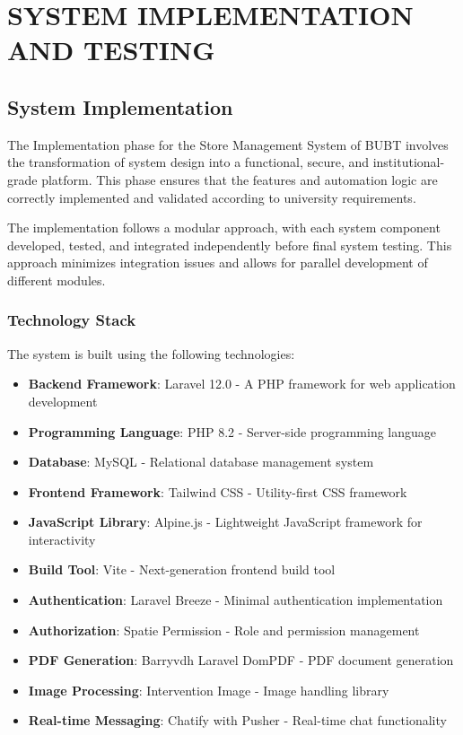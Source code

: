 \chapter{SYSTEM IMPLEMENTATION AND TESTING}
\label{chap:implementation}

\section{System Implementation}

The Implementation phase for the Store Management System of BUBT involves the transformation of system design into a functional, secure, and institutional-grade platform. This phase ensures that the features and automation logic are correctly implemented and validated according to university requirements.

The implementation follows a modular approach, with each system component developed, tested, and integrated independently before final system testing. This approach minimizes integration issues and allows for parallel development of different modules.

\subsection{Technology Stack}

The system is built using the following technologies:

\begin{itemize}
    \item \textbf{Backend Framework}: Laravel 12.0 - A PHP framework for web application development
    \item \textbf{Programming Language}: PHP 8.2 - Server-side programming language
    \item \textbf{Database}: MySQL - Relational database management system
    \item \textbf{Frontend Framework}: Tailwind CSS - Utility-first CSS framework
    \item \textbf{JavaScript Library}: Alpine.js - Lightweight JavaScript framework for interactivity
    \item \textbf{Build Tool}: Vite - Next-generation frontend build tool
    \item \textbf{Authentication}: Laravel Breeze - Minimal authentication implementation
    \item \textbf{Authorization}: Spatie Permission - Role and permission management
    \item \textbf{PDF Generation}: Barryvdh Laravel DomPDF - PDF document generation
    \item \textbf{Image Processing}: Intervention Image - Image handling library
    \item \textbf{Real-time Messaging}: Chatify with Pusher - Real-time chat functionality
\end{itemize}

